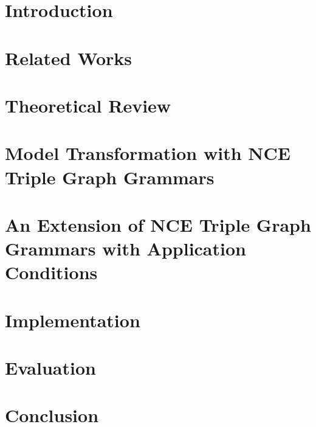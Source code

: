 \documentclass[side,11pt,oz,a4,fancybox,fancyheadings,fleqnb,openany]{book}
\begin{document}
\parindent=0in
\parskip=5pt
\setcounter{secnumdepth}{5}
\setcounter{tocdepth}{2}



\cleardoublepage


\cleardoublepage

\setcounter{page}{5}




\tableofcontents
\listoffigures
\listoftables



\chapter{Introduction}
\label{ch:Introduction}


\chapter{Related Works}
\label{ch:RelatedWorks}


\chapter{Theoretical Review}
\label{ch:TheoreticalReview}


\chapter{Model Transformation with NCE Triple Graph Grammars}
\label{ch:ModelTransformation}


\chapter{An Extension of NCE Triple Graph Grammars with Application Conditions}
\label{ch:PacExtension}


\chapter{Implementation}
\label{ch:Implementation}


\chapter{Evaluation}
\label{ch:Evaluation}


\chapter{Conclusion}
\label{ch:Conclusion}






\end{document}
